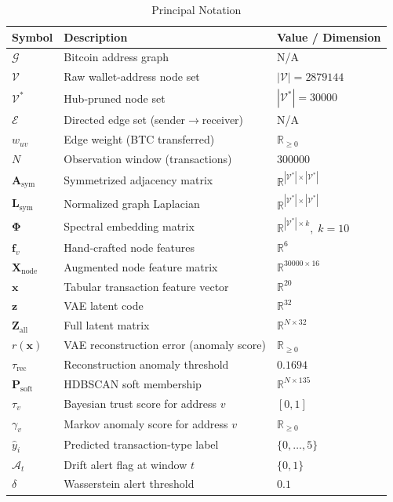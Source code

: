 \documentclass[journal]{IEEEtran}
\begin{document}
\begin{table}[!t]
  \renewcommand{\arraystretch}{1.18}
  \caption{Principal Notation}
  \label{tab:notation}
  \centering
  \small
  \begin{tabular}{@{}lll@{}}
    \toprule
    \textbf{Symbol} & \textbf{Description} & \textbf{Value / Dimension} \\
    \midrule
    $\mathcal{G}$ & Bitcoin address graph & N/A \\
    $\mathcal{V}$ & Raw wallet-address node set & $|\mathcal{V}|=\num{2879144}$ \\
    $\mathcal{V}^{*}$ & Hub-pruned node set & $|\mathcal{V}^{*}|=\num{30000}$ \\
    $\mathcal{E}$ & Directed edge set (sender$\to$receiver) & N/A \\
    $w_{uv}$ & Edge weight (BTC transferred) & $\mathbb{R}_{\geq 0}$ \\
    $N$ & Observation window (transactions) & $\num{300000}$ \\
    $\mathbf{A}_{\mathrm{sym}}$ & Symmetrized adjacency matrix & $\mathbb{R}^{|\mathcal{V}^{*}|\times|\mathcal{V}^{*}|}$ \\
    $\mathbf{L}_{\mathrm{sym}}$ & Normalized graph Laplacian & $\mathbb{R}^{|\mathcal{V}^{*}|\times|\mathcal{V}^{*}|}$ \\
    $\boldsymbol{\Phi}$ & Spectral embedding matrix & $\mathbb{R}^{|\mathcal{V}^{*}|\times k},\;k=10$ \\
    $\mathbf{f}_{v}$ & Hand-crafted node features & $\mathbb{R}^{6}$ \\
    $\mathbf{X}_{\mathrm{node}}$ & Augmented node feature matrix & $\mathbb{R}^{\num{30000}\times 16}$ \\
    $\mathbf{x}$ & Tabular transaction feature vector & $\mathbb{R}^{20}$ \\
    $\mathbf{z}$ & VAE latent code & $\mathbb{R}^{32}$ \\
    $\mathbf{Z}_{\mathrm{all}}$ & Full latent matrix & $\mathbb{R}^{N\times 32}$ \\
    $r(\mathbf{x})$ & VAE reconstruction error (anomaly score) & $\mathbb{R}_{\geq 0}$ \\
    $\tau_{\mathrm{rec}}$ & Reconstruction anomaly threshold & $0.1694$ \\
    $\mathbf{P}_{\mathrm{soft}}$ & HDBSCAN soft membership & $\mathbb{R}^{N\times 135}$ \\
    $\tau_{v}$ & Bayesian trust score for address $v$ & $[0,1]$ \\
    $\gamma_{v}$ & Markov anomaly score for address $v$ & $\mathbb{R}_{\geq 0}$ \\
    $\hat{y}_{i}$ & Predicted transaction-type label & $\{0,\ldots,5\}$ \\
    $\mathcal{A}_{t}$ & Drift alert flag at window $t$ & $\{0,1\}$ \\
    $\delta$ & Wasserstein alert threshold & $0.1$ \\
    \bottomrule
  \end{tabular}
\end{table}
\end{document}
